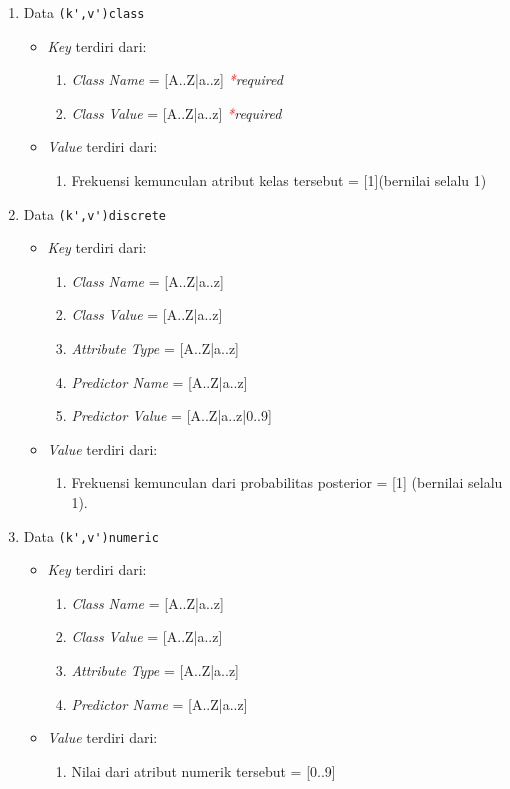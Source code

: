 \begin{enumerate}
	\item{Data \verb|(k',v')class|}
	\begin{itemize}
		\item \textit{Key} terdiri dari:
		\begin{enumerate}
			\item \textit{Class Name} = [A..Z|a..z] \textit{\textcolor{red}{*}required}
			\item \textit{Class Value} = [A..Z|a..z] \textit{\textcolor{red}{*}required}
		\end{enumerate}
		\item \textit{Value} terdiri dari:
		\begin{enumerate}
			\item Frekuensi kemunculan atribut kelas tersebut = [1](bernilai selalu 1)
		\end{enumerate}
	\end{itemize}
	
	\item{Data \verb|(k',v')discrete|}
	\begin{itemize}
		\item \textit{Key} terdiri dari:
		\begin{enumerate}
			\item \textit{Class Name} = [A..Z|a..z] 
			\item \textit{Class Value} = [A..Z|a..z] 
			\item \textit{Attribute Type} = [A..Z|a..z] 
			\item \textit{Predictor Name} = [A..Z|a..z] 
			\item \textit{Predictor Value} = [A..Z|a..z|0..9] 
		\end{enumerate}
		\item \textit{Value} terdiri dari:
		\begin{enumerate}
			\item Frekuensi kemunculan dari probabilitas posterior = [1] (bernilai selalu 1).
		\end{enumerate}
	\end{itemize}

	\item{Data \verb|(k',v')numeric|}
	\begin{itemize}
		\item \textit{Key} terdiri dari:
		\begin{enumerate}
			\item \textit{Class Name} = [A..Z|a..z] 
			\item \textit{Class Value} = [A..Z|a..z] 
			\item \textit{Attribute Type} = [A..Z|a..z] 
			\item \textit{Predictor Name} = [A..Z|a..z] 
		\end{enumerate}
		\item \textit{Value} terdiri dari:
		\begin{enumerate}
			\item Nilai dari atribut numerik tersebut = [0..9]
		\end{enumerate}
	\end{itemize}

\end{enumerate}

